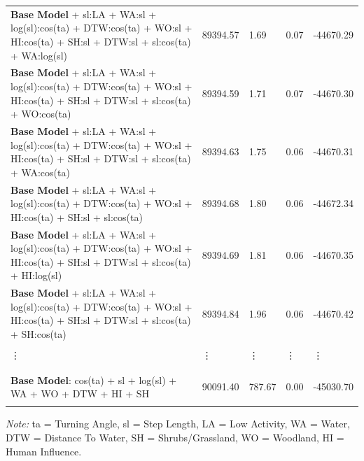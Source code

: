 \documentclass[../FinalThesis.tex]{subfiles}
\begin{document}
\begin{table}[hbpt]
\begin{adjustbox}{max width=1.3\textwidth, angle=90, center}
\begin{threeparttable}
\begin{tabular}{lllll}
      \textbf{Base Model} + sl:LA + WA:sl + log(sl):cos(ta) + DTW:cos(ta) + WO:sl + HI:cos(ta) + SH:sl + DTW:sl + sl:cos(ta) + WA:log(sl)  & 89394.57 & 1.69          & 0.07   & -44670.29 \\
      \textbf{Base Model} + sl:LA + WA:sl + log(sl):cos(ta) + DTW:cos(ta) + WO:sl + HI:cos(ta) + SH:sl + DTW:sl + sl:cos(ta) + WO:cos(ta)  & 89394.59 & 1.71          & 0.07   & -44670.30 \\
      \textbf{Base Model} + sl:LA + WA:sl + log(sl):cos(ta) + DTW:cos(ta) + WO:sl + HI:cos(ta) + SH:sl + DTW:sl + sl:cos(ta) + WA:cos(ta)  & 89394.63 & 1.75          & 0.06   & -44670.31 \\
      \textbf{Base Model} + sl:LA + WA:sl + log(sl):cos(ta) + DTW:cos(ta) + WO:sl + HI:cos(ta) + SH:sl + sl:cos(ta)                        & 89394.68 & 1.80          & 0.06   & -44672.34 \\
      \textbf{Base Model} + sl:LA + WA:sl + log(sl):cos(ta) + DTW:cos(ta) + WO:sl + HI:cos(ta) + SH:sl + DTW:sl + sl:cos(ta) + HI:log(sl)  & 89394.69 & 1.81          & 0.06   & -44670.35 \\
      \textbf{Base Model} + sl:LA + WA:sl + log(sl):cos(ta) + DTW:cos(ta) + WO:sl + HI:cos(ta) + SH:sl + DTW:sl + sl:cos(ta) + SH:cos(ta)  & 89394.84 & 1.96          & 0.06   & -44670.42 \\
      \hdashline
      \\
      \vdots                                                                                                                               & \vdots   & \vdots        & \vdots & \vdots    \\
      \\
      \hdashline
      \\
      \textbf{Base Model}: cos(ta) + sl + log(sl) + WA + WO + DTW + HI + SH                                                                & 90091.40 & 787.67        & 0.00   & -45030.70 \\
      \\
      \bottomrule
     \end{tabular}
     \begin{tablenotes}
      \item \textit{Note:} ta = Turning Angle, sl = Step Length, LA = Low Activity, WA = Water,
      DTW = Distance To Water, SH = Shrubs/Grassland, WO = Woodland, HI =
      Human Influence.
     \end{tablenotes}
    \end{threeparttable}
  \end{adjustbox}
\end{table}
\restoregeometry
\end{document}
